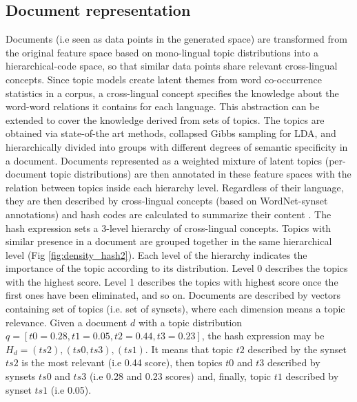 \subsection{Document representation}
Documents (i.e seen as data points in the generated space) are transformed from the original feature space based on mono-lingual topic distributions into a hierarchical-code space, so that similar data points share relevant cross-lingual concepts. Since topic models create latent themes from word co-occurrence statistics in a corpus, a cross-lingual concept specifies the knowledge about the word-word relations it contains for each language. This abstraction can be extended to cover the knowledge derived from sets of topics. The topics are obtained via state-of-the art methods, collapsed Gibbs sampling \citep{Griffiths2004b} for LDA, and hierarchically divided into groups with different degrees of semantic specificity in a document. Documents represented as a weighted mixture of latent topics (per-document topic distributions) are then annotated in these feature spaces with the relation between topics inside each hierarchy level. Regardless of their language, they are then described by cross-lingual concepts (based on WordNet-synset annotations) and hash codes are calculated to summarize their content \citep{Badenes-Olmedo2019}. The hash expression sets a 3-level hierarchy of cross-lingual concepts. Topics with similar presence in a document are grouped together in the same hierarchical level (Fig \ref{fig:density_hash2}). Each level of the hierarchy indicates the importance of the topic according to its distribution. Level 0 describes the topics with the highest score. Level 1 describes the topics with highest score once the first ones have been eliminated, and so on. Documents are described by vectors containing set of topics (i.e. set of synsets), where each dimension means a topic relevance. Given a document $d$ with a topic distribution $q = [t0=0.28, t1=0.05, t2=0.44, t3=0.23]$, the hash expression may be $H_d = {(ts2), (ts0,ts3), (ts1)}$. It means that topic $t2$ described by the synset $ts2$ is the most relevant (i.e 0.44 score), then topics $t0$ and $t3$ described by synsets $ts0$ and $ts3$ (i.e 0.28 and 0.23 scores) and, finally, topic $t1$ described by synset $ts1$ (i.e 0.05).

